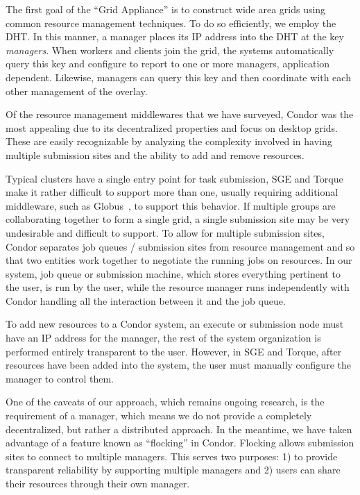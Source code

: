 \documentclass[conference]{IEEEtran}
\begin{document}
The first goal of the ``Grid Appliance'' is to construct wide area grids using
common resource management techniques.  To do so efficiently, we employ the
DHT.  In this manner, a manager places its IP address into the DHT at the key
\emph{managers}.  When workers and clients join the grid, the systems
automatically query this key and configure to report to one or more managers,
application dependent.  Likewise, managers can query this key and then
coordinate with each other management of the overlay.

Of the resource management middlewares that we have surveyed, Condor was the
most appealing due to its decentralized properties and focus on desktop grids.
These are easily recognizable by analyzing the complexity involved in having
multiple submission sites and the ability to add and remove resources.

Typical clusters have a single entry point for task submission, SGE and Torque
make it rather difficult to support more than one, usually requiring additional
middleware, such as Globus~\cite{globus}, to support this behavior.  If
multiple groups are collaborating together to form a single grid, a single
submission site may be very undesirable and difficult to support.  To allow for
multiple submission sites, Condor separates job queues / submission sites from
resource management and so that two entities work together to negotiate the
running jobs on resources.  In our system, job queue or submission machine,
which stores everything pertinent to the user, is run by the user, while the
resource manager runs independently with Condor handling all the interaction
between it and the job queue.

To add new resources to a Condor system, an execute or submission node must
have an IP address for the manager, the rest of the system organization is
performed entirely transparent to the user.  However, in SGE and Torque, after
resources have been added into the system, the user must manually configure the
manager to control them.

One of the caveats of our approach, which remains ongoing research, is the
requirement of a manager, which means we do not provide a completely
decentralized, but rather a distributed approach.  In the meantime, we have
taken advantage of a feature known as ``flocking'' in Condor.  Flocking allows
submission sites to connect to multiple managers.  This serves two purposes: 1)
to provide transparent reliability by supporting multiple managers and 2) users
can share their resources through their own manager.
\end{document}
